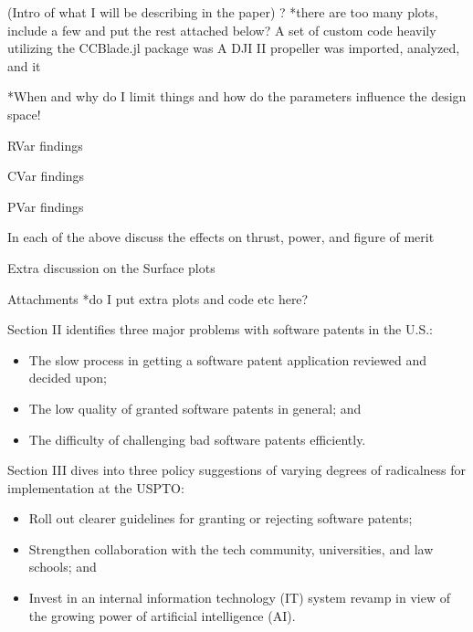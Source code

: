 \documentclass[12pt]{texmemo} %
\begin{document}
\maketitle

\highlight(Intro of what I will be describing in the paper) ?
*there are too many plots, include a few and put the rest attached below?
A set of custom code heavily utilizing the CCBlade.jl package was A DJI II propeller was imported, analyzed, and it

*When and why do I limit things and how do the parameters influence the design space!

RVar findings

CVar findings

PVar findings

In each of the above discuss the effects on thrust, power, and figure of merit

Extra discussion on the Surface plots

Attachments
*do I put extra plots and code etc here?





Section II identifies three major problems with software patents in the U.S.:
\setlength{\parskip}{0pt} %
\begin{itemize}
    \item The slow process in getting a software patent application reviewed and decided upon;
    \item The low quality of granted software patents in general; and
    \item The difficulty of challenging bad software patents efficiently.
\end{itemize}
\setlength{\parskip}{0.5\baselineskip plus 2pt} %

Section III dives into three policy suggestions of varying degrees of radicalness for implementation at the USPTO:
\setlength{\parskip}{0pt} %
\begin{itemize}
    \item Roll out clearer guidelines for granting or rejecting software patents;
    \item Strengthen collaboration with the tech community, universities, and law schools; and
    \item Invest in an internal information technology (IT) system revamp in view of the growing power of artificial intelligence (AI).
\end{itemize}
\setlength{\parskip}{0.5\baselineskip plus 2pt} %
\end{document}
